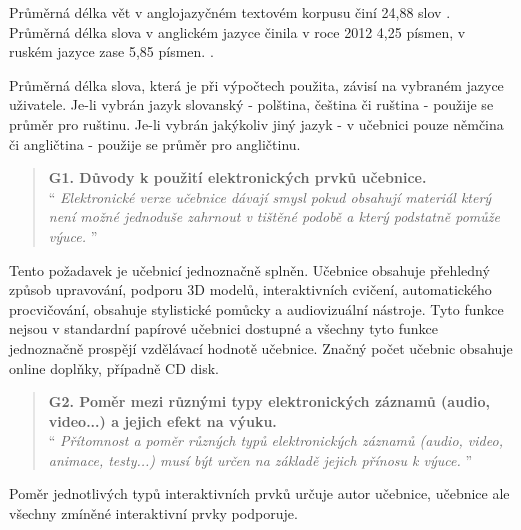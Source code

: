 \documentclass[12pt]{article}
\begin{document}
Průměrná délka vět v anglojazyčném textovém korpusu činí 24,88 slov \cite{LengthOfSentence}. Průměrná délka slova v anglickém jazyce činila v roce 2012 4,25 písmen, v ruském jazyce zase 5,85 písmen. \cite{LengthOfWord}.

Průměrná délka slova, která je při výpočtech použita, závisí na vybraném jazyce uživatele. Je-li vybrán jazyk slovanský - polština, čeština či ruština - použije se průměr pro ruštinu. Je-li vybrán jakýkoliv jiný jazyk - v učebnici pouze němčina či angličtina - použije se průměr pro angličtinu.

\filbreak

\begin{samepage}
	\begin{quotation}
		\textbf{G1. Důvody k použití elektronických prvků učebnice.} \\
		\enquote{\textit{
				Elektronické verze učebnice dávají smysl pokud obsahují materiál který není možné jednoduše zahrnout v tištěné podobě a který podstatně pomůže výuce.
		}}
	\end{quotation}

	Tento požadavek je učebnicí jednoznačně splněn. Učebnice obsahuje přehledný způsob upravování, podporu 3D modelů, interaktivních cvičení, automatického procvičování, obsahuje stylistické pomůcky a audiovizuální nástroje. Tyto funkce nejsou v standardní papírové učebnici dostupné a všechny tyto funkce jednoznačně prospějí vzdělávací hodnotě učebnice. Značný počet učebnic obsahuje online doplňky, případně CD disk.
\end{samepage}

\filbreak

\begin{samepage}
	\begin{quotation}
		\textbf{G2. Poměr mezi různými typy elektronických záznamů (audio, video...) a jejich efekt na výuku.} \\
		\enquote{\textit{
				Přítomnost a poměr různých typů elektronických záznamů (audio, video, animace, testy...)  musí být určen na základě jejich přínosu k výuce.
		}}
	\end{quotation}

	Poměr jednotlivých typů interaktivních prvků určuje autor učebnice, učebnice ale všechny zmíněné interaktivní prvky podporuje.
\end{samepage}

\filbreak
\end{document}
